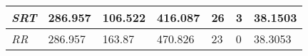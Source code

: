 \documentclass{article}
\begin{document}
\begin{table}[h!]
\begin{tabular}{|l|l|l|l|l|l|l|}
  \textit{SRT}       & 286.957                                                                          & 106.522                                                                     & 416.087                                                                            & 26                                                                                    & 3                                                                                   & 38.1503                                                                    \\ \hline
  \textit{RR}        & 286.957                                                                          & 163.87                                                                      & 470.826                                                                            & 23                                                                                    & 0                                                                                   & 38.3053                                                                    \\ \hline
  \end{tabular}
  \label{table:5}
\end{table}
\end{document}
